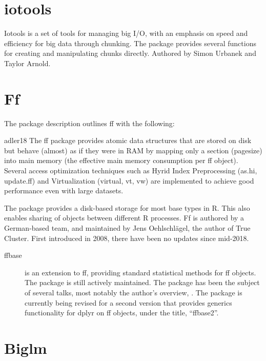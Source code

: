 \documentclass[10pt,a4paper]{article}
\begin{document}
\section{iotools}
\label{sec:iotools}

Iotools is a set of tools for managing big I/O, with an emphasis on
speed and efficiency for big data through chunking\cite{urbanek20b}.
The package provides several functions for creating and manipulating
chunks directly. Authored by Simon Urbanek and Taylor Arnold.

\section{Ff}
\label{sec:ff}

The package description outlines ff with the following:

\begin{displaycquote}{adler18}
  The ff package provides atomic data structures that are stored on
  disk but behave (almost) as if they were in RAM by mapping only a
  section (pagesize) into main memory (the effective main memory
  consumption per ff object). Several access optimization techniques
  such as Hyrid Index Preprocessing (as.hi, update.ff) and
  Virtualization (virtual, vt, vw) are implemented to achieve good
  performance even with large datasets.
\end{displaycquote}

The package provides a disk-based storage for most base types in R.
This also enables sharing of objects between different R processes. Ff
is authored by a German-based team, and maintained by Jens
Oehlschlägel, the author of True Cluster. First introduced in
2008\cite{adler08:_large_r}, there have been no updates since
mid-2018.

\begin{description}
\item[ffbase\cite{jonge20}] is an extension to ff, providing standard
  statistical methods for ff objects. The package is still actively
  maintained. The package has been the subject of several talks, most
  notably the author's overview, \textcite{wijffels13}. The package is
  currently being revised for a second version that provides generics
  functionality for dplyr on ff objects, under the title,
  ``ffbase2''\cite{jonge15}.
\end{description}

\section{Biglm}
\label{sec:biglm}
\end{document}
